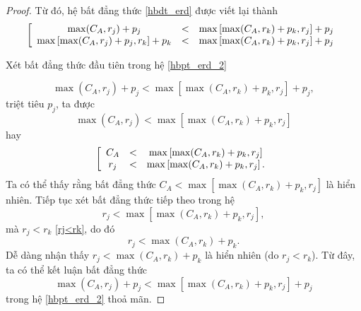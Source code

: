 \documentclass[12pt,a4paper]{report}
\begin{document}
\begin{proof}
	Từ đó, hệ bất đẳng thức \eqref{hbdt_erd} được viết lại thành
	\begin{equation} \label{hbpt_erd_2}
		\left[
			\begin{array}{c c c}
				\max (C_A, r_j) + p_j &<& \max \left[ \max (C_A, r_k) + p_k, r_j \right] + p_j \\
				\max \left[ \max (C_A, r_j) + p_j, r_k \right] + p_k &<& \max \left[ \max (C_A, r_k) + p_k, r_j \right] + p_j
			\end{array}
		\right.
	\end{equation}

	Xét bất đẳng thức đầu tiên trong hệ \eqref{hbpt_erd_2}

	\begin{equation}
		\max (C_A, r_j) + p_j < \max \left[ \max (C_A, r_k) + p_k, r_j \right] + p_j,
	\end{equation}
	triệt tiêu $p_j$, ta được
	\begin{equation}
		\max (C_A, r_j) < \max \left[ \max (C_A, r_k) + p_k, r_j \right]
	\end{equation}
	hay
	\begin{equation}
		\left[
			\begin{array}{c c c}
				C_A &<& \max \left[ \max (C_A, r_k) + p_k, r_j \right] \\
				r_j &<& \max \left[ \max (C_A, r_k) + p_k, r_j \right].
			\end{array}
		\right.
	\end{equation}
	Ta có thể thấy rằng bất đẳng thức $C_A < \max \left[ \max (C_A, r_k) + p_k, r_j \right]$ là hiển nhiên.
	Tiếp tục xét bất đẳng thức tiếp theo trong hệ
	\begin{equation}
			r_j < \max \left[ \max (C_A, r_k) + p_k, r_j \right],
	\end{equation}
	mà $r_j<r_k$ \eqref{rj<rk}, do đó
	\begin{equation}
			r_j < \max (C_A, r_k) + p_k.
	\end{equation}
	Dễ dàng nhận thấy $r_j < \max (C_A, r_k) + p_k$ là hiển nhiên (do $r_j<r_k$). Từ đây, ta có thể kết luận bất đẳng thức
	\begin{equation*}
		\max (C_A, r_j) + p_j < \max \left[ \max (C_A, r_k) + p_k, r_j \right] + p_j
	\end{equation*}
	trong hệ \eqref{hbpt_erd_2} thoả mãn.


\end{proof}
\end{document}
